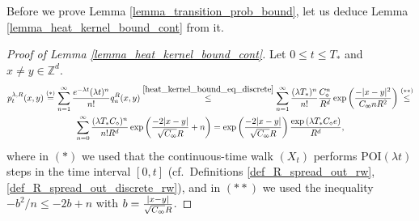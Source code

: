 \documentclass[a4paper,12pt]{article}
\newcommand{\ddiamond}{\diamond \hspace{-.05cm} \diamond}
\begin{document}
Before we prove Lemma \ref{lemma_transition_prob_bound}, let us deduce Lemma \ref{lemma_heat_kernel_bound_cont} from it.

\begin{proof}[Proof of Lemma \ref{lemma_heat_kernel_bound_cont}] Let $0 \leq t \leq T_*$ and $x\neq y \in \mathbb{Z}^d$.
\begin{multline*}
 p^{\lambda,R}_{t}(x,y)\stackrel{ (*) }{=} \sum_{n=1}^{\infty} \frac{  e^{-\lambda t} (\lambda t)^n}{n!} q_{n}^{R}(x,y)
 \stackrel{ \eqref{heat_kernel_bound_eq_discrete} }{\leq}
 \sum_{n=1}^{\infty}  \frac{(\lambda T_*)^n}{n!} \frac{C_{\diamond}^n  }{R^{d}}  \exp\left(   \frac{-|x-y|^2}{C_{\ddiamond}  n R^2 } \right)
 \stackrel{(**)}{\leq} \\
  \sum_{n=0}^{\infty}  \frac{(\lambda T_* C_{\diamond} )^n}{n! R^d }   \exp\left(   \frac{ - 2 |x-y|}{ \sqrt{C_{\ddiamond}} R } + n \right) =
    \exp\left(   \frac{- 2 |x-y|}{ \sqrt{C_{\ddiamond}} R }  \right) \frac{ \exp\left( \lambda T_* C_{\diamond} e  \right)  }{R^d} ,
  \end{multline*}
  where in $(*)$ we used that  the continuous-time walk $(X_t)$ performs $\mathrm{POI}(\lambda t)$ steps in the time interval $[0,t]$
  (cf.\ Definitions \ref{def_R_spread_out_rw}, \ref{def_R_spread_out_discrete_rw}), and in $(**)$ we used the inequality
  $-b^2/n \leq -2b+n$ with $b=\frac{|x-y|}{ \sqrt{C_{\ddiamond} } R }$.
\end{proof}
\end{document}
